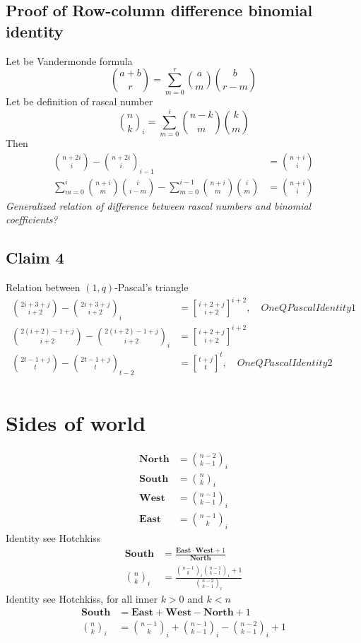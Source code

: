 \documentclass[12pt,letterpaper,oneside,reqno]{amsart}
\newcommand \rascalNumber [3] {\binom{#1}{#2}_{#3}}
\newcommand \north[0] {\mathbf{North}}
\newcommand \south[0] {\mathbf{South}}
\newcommand \west[0] {\mathbf{West}}
\newcommand \east[0] {\mathbf{East}}
\newcommand{\genstirlingI}[3]{%
    \genfrac{[}{]}{0pt}{#1}{#2}{#3}%
}
\newcommand{\oneQBinomial}[3]{\genstirlingI{}{#1}{#2}^{#3}}
\numberwithin{equation}{section}
\begin{document}
\subsection{Proof of Row-column difference binomial identity}
Let be Vandermonde formula
\begin{equation*}
    \binom{a+b}{r} = \sum_{m=0}^{r} \binom{a}{m} \binom{b}{r-m}
\end{equation*}
Let be definition of rascal number
\begin{equation*}
    \rascalNumber{n}{k}{i} = \sum_{m=0}^{i} \binom{n-k}{m} \binom{k}{m}
\end{equation*}
Then
\begin{align*}
    \binom{n+2i}{i} - \rascalNumber{n+2i}{i}{i-1} &= \binom{n+i}{i}\\
    \sum_{m=0}^{i} \binom{n+i}{m} \binom{i}{i-m} - \sum_{m=0}^{i-1} \binom{n+i}{m} \binom{i}{m} &= \binom{n+i}{i}
\end{align*}
\textit{Generalized relation of difference between rascal numbers and binomial coefficients?}
\subsection{Claim 4} Relation between $(1,q)$-Pascal's triangle
\begin{align*}
    \binom{2i+3+j}{i+2} - \rascalNumber{2i+3+j}{i+2}{i} &= \oneQBinomial{i+2+j}{i+2}{i+2}, \quad OneQPascalIdentity1 \\
    \binom{2(i+2)-1+j}{i+2} - \rascalNumber{2(i+2)-1+j}{i+2}{i} &= \oneQBinomial{i+2+j}{i+2}{i+2} \\
    \binom{2t-1+j}{t} - \rascalNumber{2t-1+j}{t}{t-2} &= \oneQBinomial{t+j}{t}{t}, \quad OneQPascalIdentity2 \\
\end{align*}


\section{Sides of world}
\begin{align*}
    \north &= \rascalNumber{n-2}{k-1}{i} \\
    \south &= \rascalNumber{n}{k}{i} \\
    \west  &= \rascalNumber{n-1}{k-1}{i} \\
    \east  &= \rascalNumber{n-1}{k}{i}
\end{align*}
Identity see Hotchkiss
\begin{align}
    \south                  &= \frac{\east \cdot \west + 1}{\north} \\
    \rascalNumber{n}{k}{i}  &= \frac{\rascalNumber{n-1}{k}{i} \rascalNumber{n-1}{k-1}{i} +1}{\rascalNumber{n-2}{k-1}{i}}
\end{align}
Identity see Hotchkiss, for all inner $k > 0$ and $k < n$
\begin{align}
    \south                 &= \east + \west - \north  + 1 \\
    \rascalNumber{n}{k}{i} &= \rascalNumber{n-1}{k}{i} + \rascalNumber{n-1}{k-1}{i} - \rascalNumber{n-2}{k-1}{i} + 1
\end{align}
\end{document}
